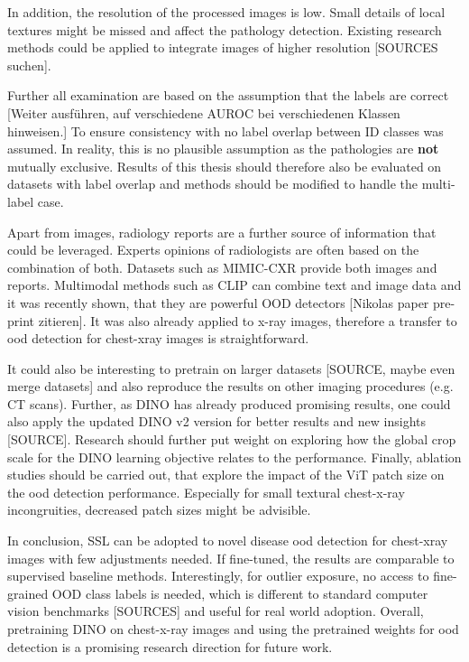 In addition, the resolution of the processed images is low. 
Small details of local textures might be missed and affect the pathology detection. 
Existing research methods could be applied to integrate images of higher resolution [SOURCES suchen].
\par
Further all examination are based on the assumption that the labels are correct [Weiter ausführen, auf verschiedene AUROC bei verschiedenen Klassen hinweisen.]
To ensure consistency with \citep{Berger2021} no label overlap between ID classes was assumed. 
In reality, this is no plausible assumption as the pathologies are \textbf{not} mutually exclusive.
Results of this thesis should therefore also be evaluated on datasets with label overlap and methods should be modified to handle the multi-label case.
\par
Apart from images, radiology reports are a further source of information that could be leveraged. 
Experts opinions of radiologists are often based on the combination of both. 
Datasets such as MIMIC-CXR \citep{Johnson2019} provide both images and reports. 
Multimodal methods such as CLIP \citep{Radford2021} can combine text and image data and it was recently shown, that they are powerful OOD detectors [Nikolas paper pre-print zitieren].
It was also already applied to x-ray images, therefore a transfer to ood detection for chest-xray images is straightforward.
\par
It could also be interesting to pretrain on larger datasets [SOURCE, maybe even merge datasets] and also reproduce the results on other imaging procedures (e.g. CT scans).
Further, as DINO has already produced promising results, one could also apply the updated DINO v2 version for better results and new insights [SOURCE].
Research should further put weight on exploring how the global crop scale for the DINO learning objective relates to the performance.
Finally, ablation studies should be carried out, that explore the impact of the ViT patch size on the ood detection performance.
Especially for small textural chest-x-ray incongruities, decreased patch sizes might be advisible.
\par
In conclusion, SSL can be adopted to novel disease ood detection for chest-xray images with few adjustments needed.
If fine-tuned, the results are comparable to supervised baseline methods.
Interestingly, for outlier exposure, no access to fine-grained OOD class labels is needed, which is different to standard computer vision benchmarks [SOURCES] and useful for real world adoption.
Overall, pretraining DINO on chest-x-ray images and using the pretrained weights for ood detection is a promising research direction for future work.
